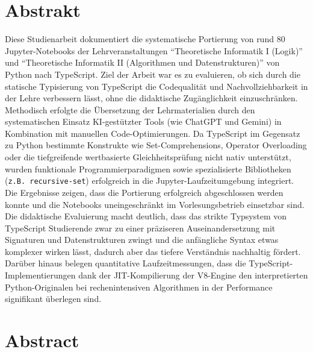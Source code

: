 \section*{Abstrakt}

Diese Studienarbeit dokumentiert die systematische Portierung von rund 80 Jupyter-Notebooks der Lehrveranstaltungen \enquote{Theoretische Informatik I (Logik)} und \enquote{Theoretische Informatik II (Algorithmen und Datenstrukturen)} von Python nach TypeScript. Ziel der Arbeit war es zu evaluieren, ob sich durch die statische Typisierung von TypeScript die Codequalität und Nachvollziehbarkeit in der Lehre verbessern lässt, ohne die didaktische Zugänglichkeit einzuschränken.\\
Methodisch erfolgte die Übersetzung der Lehrmaterialien durch den systematischen Einsatz \ac{KI}-gestützter Tools (wie ChatGPT und Gemini) in Kombination mit manuellen Code-Optimierungen. Da TypeScript im Gegensatz zu Python bestimmte Konstrukte wie Set-Comprehensions, Operator Overloading oder die tiefgreifende wertbasierte Gleichheitsprüfung nicht nativ unterstützt, wurden funktionale Programmierparadigmen sowie spezialisierte Bibliotheken (\texttt{z.B. recursive-set}) erfolgreich in die Jupyter-Laufzeitumgebung integriert.\\
Die Ergebnisse zeigen, dass die Portierung erfolgreich abgeschlossen werden konnte und die Notebooks uneingeschränkt im Vorlesungsbetrieb einsetzbar sind. Die didaktische Evaluierung macht deutlich, dass das strikte Typsystem von TypeScript Studierende zwar zu einer präziseren Auseinandersetzung mit Signaturen und Datenstrukturen zwingt und die anfängliche Syntax etwas komplexer wirken lässt, dadurch aber das tiefere Verständnis nachhaltig fördert. Darüber hinaus belegen quantitative Laufzeitmessungen, dass die TypeScript-Implementierungen dank der JIT-Kompilierung der V8-Engine den interpretierten Python-Originalen bei rechenintensiven Algorithmen in der Performance signifikant überlegen sind.

\newpage
\section*{Abstract}

